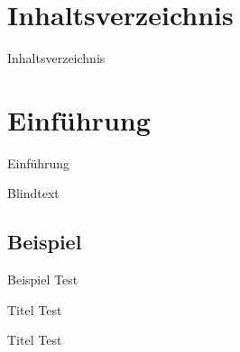 \documentclass[aspectratio=169]{beamer}
\title{\thesisTitle{}}
\subtitle{Bachelorverteidigung}
\author[A. Linz]{Andreas Linz}
\institute[]{\thesisUniversityDepartment}
\date{\today}
\begin{document}
    \begin{frame}
        \titlepage
    \end{frame} 
    
    \section{Inhaltsverzeichnis}
    \begin{frame}{Inhaltsverzeichnis}
        \tableofcontents
    \end{frame}

    \section{Einführung}
    \begin{frame}{Einführung}
        \begin{block}{Blindtext}
            \blindtext[1]
        \end{block}
    \end{frame}

    \subsection{Beispiel}
    \begin{frame}{Beispiel}
        Test
        \begin{exampleblock}{Titel}
            Test
        \end{exampleblock}
        \begin{alertblock}{Titel}
            Test
        \end{alertblock}
    \end{frame}
\end{document}
